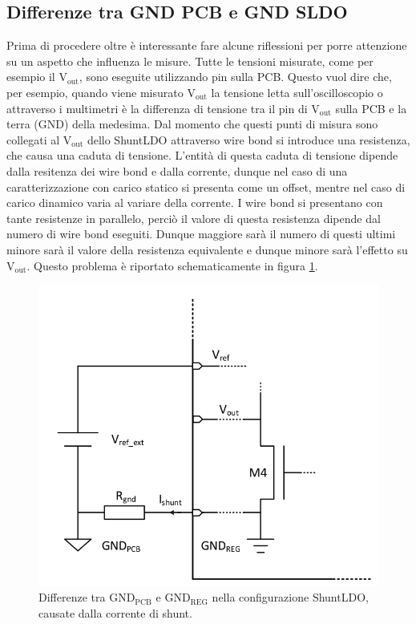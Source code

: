 \subsection{Differenze tra GND PCB e GND SLDO}
Prima di procedere oltre è interessante fare alcune riflessioni per porre attenzione su un aspetto che influenza le misure. 
Tutte le tensioni misurate, come per esempio il $\mathrm{V_{out}}$, sono eseguite utilizzando pin sulla PCB. Questo vuol dire che, per esempio, quando viene misurato $\mathrm{V_{out}}$ la tensione letta sull'oscilloscopio o attraverso i multimetri è la differenza di tensione tra il pin di $\mathrm{V_{out}}$ sulla PCB e la terra (GND) della medesima. Dal momento che questi punti di misura sono collegati al $\mathrm{V_{out}}$ dello ShuntLDO attraverso wire bond si introduce una resistenza, che causa una caduta di tensione. L'entità di questa caduta di tensione dipende dalla resitenza dei wire bond e dalla corrente, dunque nel caso di una caratterizzazione con carico statico si presenta come un offset, mentre nel caso di carico dinamico varia al variare della corrente. 
I wire bond si presentano con tante resistenze in parallelo, perciò il valore di questa resistenza dipende dal numero di wire bond eseguiti. Dunque maggiore sarà il numero di questi ultimi minore sarà il valore della resistenza equivalente e dunque minore sarà l'effetto su $\mathrm{V_{out}}$. Questo problema è riportato schematicamente in figura \ref{Ground}.

\begin{figure}
\centering
\includegraphics[scale=.3]{Immagini/Ground}
\caption{Differenze tra $\mathrm{GND_{PCB}}$ e $\mathrm{GND_{REG}}$ nella configurazione ShuntLDO, causate dalla corrente di shunt.}
\label{Ground}
\end{figure}

